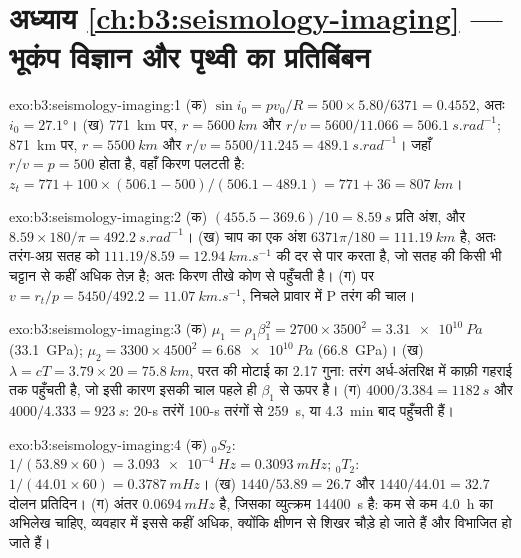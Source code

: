 \section*{अध्याय \ref{ch:b3:seismology-imaging} --- भूकंप विज्ञान और पृथ्वी का प्रतिबिंबन}

\begin{solution}{exo:b3:seismology-imaging:1}
(क) $\sin i_0 = pv_0/R = 500\times5.80/6371 = 0.4552$, अतः $i_0 = \ang{27.1}$।
(ख) \qty{771}{km} पर, $r = \qty{5600}{km}$ और $r/v = 5600/11.066 =
\qty{506.1}{s.rad^{-1}}$; \qty{871}{km} पर, $r = \qty{5500}{km}$ और $r/v =
5500/11.245 = \qty{489.1}{s.rad^{-1}}$। जहाँ $r/v = p = 500$ होता है, वहाँ किरण पलटती है:
$z_t = 771 + 100\times(506.1 - 500)/(506.1 - 489.1) = 771 + 36 =
\qty{807}{km}$।
\end{solution}

\begin{solution}{exo:b3:seismology-imaging:2}
(क) $(455.5 - 369.6)/10 = \qty{8.59}{s}$ प्रति अंश, और
$8.59\times180/\pi = \qty{492.2}{s.rad^{-1}}$। (ख) चाप का एक अंश
$6371\pi/180 = \qty{111.19}{km}$ है, अतः तरंग-अग्र सतह को
$111.19/8.59 = \qty{12.94}{km.s^{-1}}$ की दर से पार करता है, जो सतह की किसी भी चट्टान से कहीं अधिक तेज़ है;
अतः किरण तीखे कोण से पहुँचती है। (ग)  पर $v = r_t/p =
5450/492.2 = \qty{11.07}{km.s^{-1}}$, निचले प्रावार में P तरंग की चाल।
\end{solution}

\begin{solution}{exo:b3:seismology-imaging:3}
(क) $\mu_1 = \rho_1\beta_1^2 = 2700\times3500^2 = \qty{3.31e10}{Pa}$
(\qty{33.1}{GPa}); $\mu_2 = 3300\times4500^2 = \qty{6.68e10}{Pa}$
(\qty{66.8}{GPa})। (ख) $\lambda = cT = 3.79\times20 = \qty{75.8}{km}$, परत की मोटाई का 2.17
गुना: तरंग अर्ध-अंतरिक्ष में काफ़ी गहराई तक पहुँचती है, जो
इसी कारण इसकी चाल पहले ही $\beta_1$ से ऊपर है। (ग) $4000/3.384 = \qty{1182}{s}$ और
$4000/4.333 = \qty{923}{s}$: 20-s तरंगें 100-s तरंगों से \qty{259}{s}, या
\qty{4.3}{min} बाद पहुँचती हैं।
\end{solution}

\begin{solution}{exo:b3:seismology-imaging:4}
(क) ${}_0S_2$: $1/(53.89\times60) = \qty{3.093e-4}{Hz} = \qty{0.3093}{mHz}$;
${}_0T_2$: $1/(44.01\times60) = \qty{0.3787}{mHz}$। (ख) $1440/53.89 = 26.7$
और $1440/44.01 = 32.7$ दोलन प्रतिदिन। (ग) अंतर
$\qty{0.0694}{mHz}$ है, जिसका व्युत्क्रम \qty{14400}{s} है: कम से कम \qty{4.0}{h} का
अभिलेख चाहिए, व्यवहार में इससे कहीं अधिक, क्योंकि क्षीणन से शिखर चौड़े हो जाते हैं और
विभाजित हो जाते हैं।
\end{solution}

